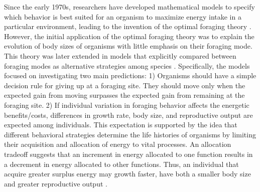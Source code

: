 \documentclass[12pt]{article}
\begin{document}
\vspace{20px}

Since the early 1970s, researchers have developed mathematical models to specify which behavior is best suited for an organism to maximize energy intake in a particular environment, leading to the invention of the optimal foraging theory \citep{schoener1971theory,charnov1976optimal}. However, the initial application of the optimal foraging theory was to explain the evolution of body sizes of organisms with little emphasis on their foraging mode. This theory was later extended in models that explicitly compared between foraging modes as alternative strategies among species \citep[e.g.,][]{vitt1978body,janetos1982active}. Specifically, the models focused on investigating two main predictions: 1) Organisms should have a simple decision rule for giving up at a foraging site. They should move only when the expected gain from moving surpasses the expected gain from remaining at the foraging site. 2) If individual variation in foraging behavior affects the energetic benefits/costs, differences in growth rate, body size, and reproductive output are expected among individuals. This expectation is supported by the idea that different behavioral strategies determine the life histories of organisms by limiting their acquisition and allocation of energy to vital processes. An allocation tradeoff suggests that an increment in energy allocated to one function results in a decrement in energy allocated to other functions. Thus, an individual that acquire greater surplus energy may growth faster, have both a smaller body size and greater reproductive output \citep{stearns1992evolution,roff2002life}.

\vspace{20px}
\end{document}

